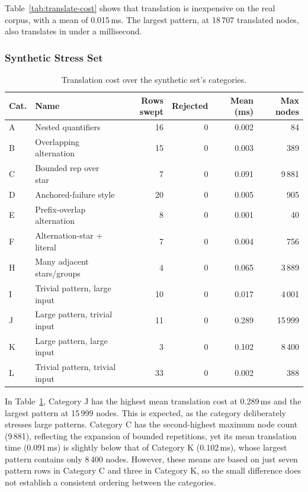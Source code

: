 Table~\ref{tab:translate-cost} shows that translation is inexpensive 
on the real corpus, with a mean of 0.015\,ms. 
The largest pattern, at 18\,707 translated nodes, 
also translates in under a millisecond. 

%
%
%

\subsubsection{Synthetic Stress Set}
\label{sec:eval-translate-pathological}

\begin{table}[H]
\centering
\small
\setlength{\tabcolsep}{4pt}
\begin{tabular*}{\textwidth}{@{\extracolsep{\fill}} llrrrr}
\hline
Cat. & Name & Rows swept & Rejected & Mean (ms) & Max nodes \\
\hline
A & Nested quantifiers             & 16 &  0 & 0.002 &     84 \\
B & Overlapping alternation        & 15 &  0 & 0.003 &    389 \\
C & Bounded rep over star          &  7 &  0 & 0.091 &  9\,881 \\
D & Anchored-failure style         & 20 &  0 & 0.005 &    905 \\
E & Prefix-overlap alternation     &  8 &  0 & 0.001 &     40 \\
F & Alternation-star + literal     &  7 &  0 & 0.004 &    756 \\
H & Many adjacent stars/groups     &  4 &  0 & 0.065 &  3\,889 \\
I & Trivial pattern, large input   & 10 &  0 & 0.017 &  4\,001 \\
J & Large pattern, trivial input   & 11 &  0 & 0.289 & 15\,999 \\
K & Large pattern, large input     &  3 &  0 & 0.102 &  8\,400 \\
L & Trivial pattern, trivial input & 33 &  0 & 0.002 &    388 \\
\hline
\end{tabular*}
\caption{Translation cost over the synthetic set's categories.}
\label{tab:translate-cost-patho}
\end{table}

In Table~\ref{tab:translate-cost-patho},
Category J has the highest mean translation cost
at 0.289\,ms and the largest pattern at 15\,999 nodes.
This is expected, as the category deliberately
stresses large patterns.
Category C has the second-highest maximum node count
(9\,881), reflecting the expansion of bounded repetitions,
yet its mean translation time (0.091\,ms)
is slightly below that of Category K (0.102\,ms),
whose largest pattern contains only 8\,400 nodes.
However, these means are based on just seven
pattern rows in Category C and three in Category K,
so the small difference does not establish
a consistent ordering between the categories.


